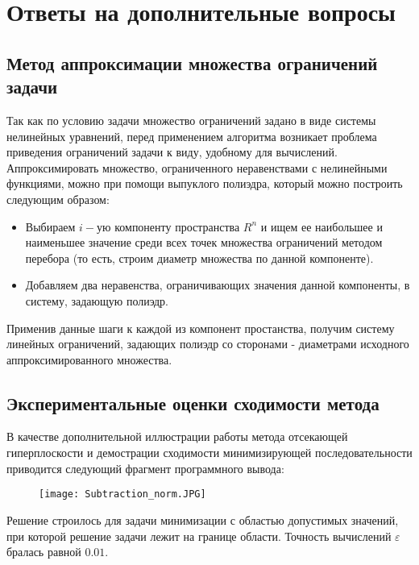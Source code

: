 \documentclass{article}
\begin{document}
\section{Ответы на дополнительные вопросы}

    \subsection{Метод аппроксимации множества ограничений задачи}
        
        \noindent Так как по условию задачи множество ограничений задано в виде системы нелинейных уравнений, перед применением алгоритма возникает проблема приведения ограничений задачи к виду, удобному для вычислений. Аппроксимировать множество, ограниченного неравенствами с нелинейными функциями, можно при помощи выпуклого полиэдра, который можно построить следующим образом:
        
        \begin{itemize}
            \item Выбираем $i-$ую компоненту пространства $R^n$ и ищем ее наибольшее и наименьшее значение среди всех точек множества ограничений методом перебора (то есть, строим диаметр множества по данной компоненте).
            \item Добавляем два неравенства, ограничивающих значения данной компоненты, в систему, задающую полиэдр.
        \end{itemize}
        
        \noindent Применив данные шаги к каждой из компонент простанства, получим систему линейных ограничений, задающих полиэдр со сторонами - диаметрами исходного аппроксимированного множества.

   \subsection{Экспериментальные оценки сходимости метода}
       \noindent  В качестве дополнительной иллюстрации работы метода отсекающей гиперплоскости и демострации сходимости минимизирующей последовательности приводится следующий фрагмент программного вывода:
        
        \begin{figure}[H]
            \centering
            \texttt{[image: Subtraction\_norm.JPG]}
        \end{figure}
        
        \noindent Решение строилось для задачи минимизации с областью допустимых значений, при которой решение задачи лежит на границе области. Точность вычислений $\varepsilon$ бралась равной $0.01$.\\
        
\end{document}
